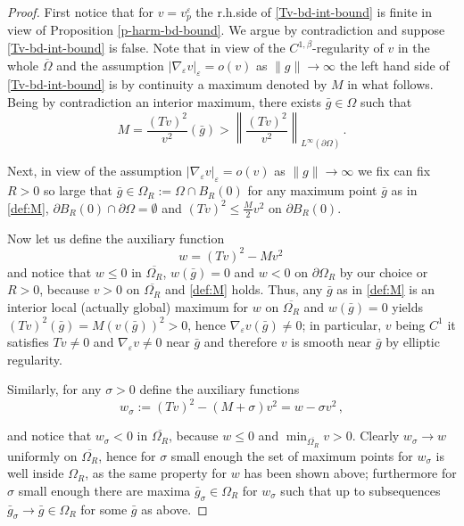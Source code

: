 \documentclass[10pt]{amsart}
\numberwithin{equation}{section}
\theoremstyle{definition}
\begin{document}
\begin{proof}
First notice that for $v=v^\varepsilon_p$ the r.h.side of \eqref{Tv-bd-int-bound} is finite in view of Proposition \ref{p-harm-bd-bound}. We argue by contradiction and suppose \eqref{Tv-bd-int-bound} is false.   Note that in view of the $C^{1,\beta}$-regularity of $v$ in the whole $\overline{\Omega}$ and the assumption  $|\nabla_\varepsilon  v|_\varepsilon=o(v)$ as $\| g\| \to \infty$ the left hand side of \eqref{Tv-bd-int-bound} is by continuity a maximum denoted by $M$ in what follows. Being by contradiction an interior maximum, there exists $\bar{g} \in \Omega$ such that
\begin{equation}
\label{def:M}
M=\frac{\left(T  v\right)^2}{v^2}  (\bar{g}) > \left\| \frac{\left(T  v\right)^2 }{v^2}  \right\|_{L^\infty ( \partial\Omega)} \, . 
\end{equation}

Next, in view of  the assumption $|\nabla_\varepsilon  v|_\varepsilon=o(v)$ as $\| g\| \to \infty$ we fix can fix $R>0$ so large that $\bar{g} \in \Omega_R:= \Omega \cap B_R(0)$ for any maximum point $\bar{g}$ as in \eqref{def:M}, $\partial B_R(0) \cap \partial \Omega=\emptyset$ and $(T v)^2  \leq \frac{M}2 v^2$
 on $\partial B_R(0)$. 

Now let us define the auxiliary function 
\[ w= \left(T   v \right)^2-M v^2 \, \]
and notice that $w \leq 0$ in $\overline{\Omega_R}$, $w(\bar{g})=0$ and $w <0$ on $\partial \Omega_R$ by our choice or $R>0$, because $v >0$ on $\overline{\Omega_R}$ and \eqref{def:M} holds.
Thus, any $\bar{g}$ as in \eqref{def:M} is an interior local (actually global) maximum for $w$ on $\overline{\Omega_R}$ and $w(\bar{g})=0$ yields $(T v )^2(\bar{g})=M (v (\bar{g}))^2 > 0$, hence $\nabla_\varepsilon v (\bar{g}) \neq 0$; in particular, $v$ being $C^1$ it satisfies $T v \neq 0$ and $\nabla_\varepsilon v  \neq 0$ near $\bar{g}$ and therefore $v$ is smooth near $\bar{g}$ by elliptic regularity.

Similarly, for any $\sigma>0$ define the auxiliary functions 
\[ w_\sigma:= \left(T  v \right)^2-(M+\sigma) v^2 =w-\sigma v^2 \, , \]

\noindent and notice that $w_\sigma< 0$ in $\overline{\Omega_R}$, because $w\leq 0$ and $ \min_{\overline{\Omega_R}} v  >0$. Clearly $w_\sigma \to w$ uniformly on $\overline{\Omega_R}$, hence for $\sigma$ small enough the set of maximum points for $w_\sigma$ is well inside $\Omega_R$, as the same property for $w$ has been shown above;  furthermore for $\sigma$ small enough there are maxima $\bar{g}_\sigma \in \Omega_R$ for $w_\sigma$ such that up to subsequences $\bar{g}_\sigma \to \bar{g} \in \Omega_R$ for some $\bar{g}$ as above. 


\end{proof}
\end{document}
